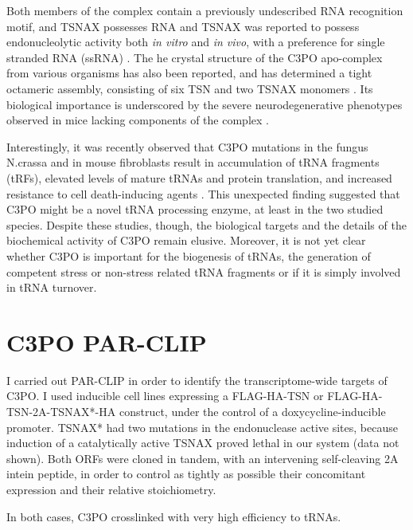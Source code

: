 \documentclass[12pt]{rockefeller}
\begin{document}
Both members of the complex contain a previously undescribed RNA recognition motif, and  TSNAX possesses RNA 	and TSNAX was reported to possess endonucleolytic activity both \textit{in vitro} and \textit{in vivo}, with a preference for single stranded RNA (ssRNA) \cite{Ye:2011bo, Tian:2011hx}. The he crystal structure of the C3PO apo-complex from various organisms has also been reported, and has determined a tight octameric assembly, consisting of six TSN and two TSNAX monomers \cite{Ye:2011bo, Tian:2011hx, Parizotto:2013dg}. Its biological importance is underscored by the severe neurodegenerative phenotypes observed in mice lacking components of the complex \cite{Stein:2006jj}. 

Interestingly, it was recently observed that C3PO mutations in the fungus N.crassa and in mouse fibroblasts result in accumulation of tRNA fragments (tRFs), elevated levels of mature tRNAs and protein translation, and increased resistance to cell death-inducing agents \cite{Li:2012kob}. This unexpected finding suggested that C3PO might be a novel tRNA processing enzyme, at least in the two studied species. Despite these studies, though, the biological targets and the details of the biochemical activity of C3PO remain elusive. Moreover, it is not yet clear whether C3PO is important for the biogenesis of tRNAs, the generation of competent stress or non-stress related tRNA fragments or if it is simply involved in tRNA turnover.       

\section{C3PO PAR-CLIP}
I carried out PAR-CLIP in order to identify the transcriptome-wide targets of C3PO. I used inducible cell lines expressing a FLAG-HA-TSN or FLAG-HA-TSN-2A-TSNAX*-HA construct, under the control of a doxycycline-inducible promoter. TSNAX* had two mutations in the endonuclease active sites, because induction of a catalytically active TSNAX proved lethal in our system (data not shown). 	Both ORFs were cloned in tandem, with an intervening self-cleaving 2A intein peptide, in order to control as tightly as possible their concomitant expression and their relative stoichiometry. 

In both cases, C3PO crosslinked with very high efficiency to tRNAs. 
\end{document}
